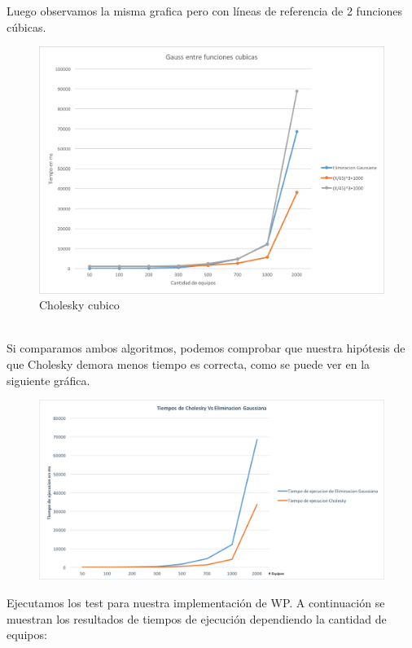Luego observamos la misma grafica pero con líneas de referencia de 2 funciones cúbicas.\\

\begin{figure}[H]
    \centering
    \includegraphics[width=1\textwidth]{IMG/gaussEntreCubicas.png}
    \caption{Cholesky cubico}
    \label{fig:Cholesky cubico}
\end{figure}

\\

Si comparamos ambos algoritmos, podemos comprobar que nuestra hipótesis de que Cholesky demora menos tiempo es correcta, como se puede ver en la siguiente gráfica.

\begin{figure}[H]
    \centering
    \includegraphics[width=1\textwidth]{IMG/tiemposgsvscholesky.png}
\end{figure}


Ejecutamos los test para nuestra implementación de WP. A continuación se muestran los resultados de tiempos de ejecución dependiendo la cantidad de equipos: \\


